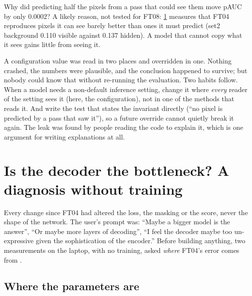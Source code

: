 Why did predicting half the pixels from a pass that could see them move pAUC by only $0.0002$? A likely reason,
not tested for FT08: \cref{sec:decoderwork:diagnosis} measures that FT04 reproduces pixels it can see barely
better than ones it must predict (set2 background 0.110 visible against 0.137 hidden). A model that cannot copy
what it sees gains little from seeing it.

\begin{lesson}
A configuration value was read in two places and overridden in one. Nothing crashed, the numbers were
plausible, and the conclusion happened to survive; but nobody could know that without re-running the
evaluation. Two habits follow. When a model needs a non-default inference setting, change it where \emph{every}
reader of the setting sees it (here, the configuration), not in one of the methods that reads it. And write the
test that states the invariant directly (``no pixel is predicted by a pass that saw it''), so a future override
cannot quietly break it again. The leak was found by people reading the code to explain it, which is one argument
for writing explanations at all.
\end{lesson}

\section{Is the decoder the bottleneck? A diagnosis without training}\label{sec:decoderwork:diagnosis}

Every change since FT04 had altered the loss, the masking or the score, never the shape of the network. The
user's prompt was: ``Maybe a bigger model is the answer'', ``Or maybe more layers of decoding'', ``I feel the
decoder maybe too un-expressive given the sophistication of the encoder.'' Before building anything, two
measurements on the laptop, with no training, asked \emph{where} FT04's error comes from
.

\subsection{Where the parameters are}

